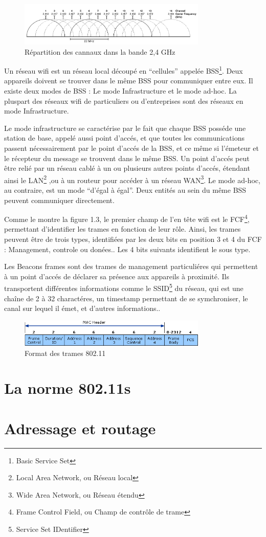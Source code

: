 \begin{figure}
   \centering
   \includegraphics[width=0.8\textwidth,natwidth=610,natheight=642]{images/cannaux.png}
   \caption{Répartition des cannaux dans la bande 2,4 GHz}
\end{figure}

Un réseau wifi est un réseau local découpé en ``cellules'' appelée BSS\footnote{Basic Service Set}. Deux appareils
doivent se trouver dans le même BSS pour communiquer entre eux. Il existe deux modes de BSS : Le mode Infrastructure et le
mode ad-hoc\cite{WFfunc2}. La pluspart des réseaux wifi de particuliers ou d'entreprises sont des réseaux en mode Infrastructure.

Le mode infrastructure se caractérise par le fait que chaque BSS posséde une station de base, appelé
aussi point d'accés, et que toutes les communications passent nécessairement par le point d'accés de la BSS, et ce même si 
l'émeteur et le récepteur du message se trouvent dans le même BSS. Un point d'accés peut être relié par un réseau cablé à
un ou plusieurs autres points d'accés, étendant ainsi le LAN\footnote{Local Area Network, ou Réseau local}
\cite{WFfunc},ou à un routeur pour accéder à un réseau WAN\footnote{Wide Area Network, ou Réseau étendu}.
Le mode ad-hoc, au contraire, est un mode ``d'égal à égal''. Deux entités au sein du même BSS peuvent communiquer directement.


Comme le montre la figure 1.3\cite{WFhead}, le premier champ de l'en tête wifi est le FCF\footnote{Frame Control Field, ou Champ
de contrôle de trame}, permettant d'identifier les trames en fonction de leur rôle. Ainsi, les trames peuvent être de trois types,
identifiées par les deux bits en position 3 et 4 du FCF : Management, controle ou donées.\cite{WFfcf}. Les 4 bits suivants
identifient le sous type.

Les Beacons frames sont des trames de management particuliéres qui permettent à un point d'accés de déclarer sa présence aux
appareils à proximité. Ils transportent différentes informations comme le SSID\footnote{Service Set IDentifier} du réseau,
qui est une chaîne de 2 à 32 charactéres, un timestamp permettant de se symchroniser, le canal sur lequel il émet, 
et d'autres informations.\cite{WFfunc2}.
\begin{figure}
   \centering
   \includegraphics[width=0.8\textwidth,natwidth=488,natheight=513]{images/header_wifi.png}
   \caption{Format des trames 802.11}
\end{figure}

\section{La norme 802.11s}
\section{Adressage et routage}